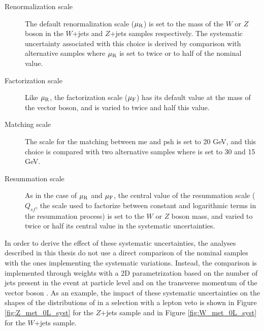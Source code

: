 \begin{description}
\item[Renormalization scale] The default renormalization scale ($\mu_{\rm{R}}$) is set to the mass of the $W$ or $Z$ boson in the $W$+jets and $Z$+jets samples respectively. 
The systematic uncertainty associated with this choice is derived by comparison with alternative samples where $\mu_{\rm{R}}$ is set to twice or to half of the nominal value. 

\item[Factorization scale] Like $\mu_{\rm{R}}$, the factorization scale ($\mu_{\rm{F}}$) has its default value at the mass of the vector boson, and is varied to twice and half this value.

\item[Matching scale] The scale for the matching between \gls{me} and \gls{psh} is set to 20 GeV, and this choice is compared with two alternative samples where is set to 30 and 15 GeV.

\item[Resummation scale] As in the case of $\mu_{\rm{R}}$ and $\mu_{\rm{F}}$, the central value of the resummation scale ($Q_{sf}$, the scale used to factorize between constant and logarithmic terms
in the resummation process) is set to the $W$ or $Z$ boson mass, and varied to twice or half its central value in the systematic uncertainties. 

\end{description}

In order to derive the effect of these systematic uncertainties, the analyses described in this thesis do not use a direct comparison of the nominal 
samples with the ones implementing the systematic variations.
Instead, the comparison is implemented through weights with a 2D parametrization based on the number of jets present in the event at particle level 
and on the transverse momentum of the vector boson \cite{Anders:2291836}.
As an example, the impact of these systematic uncertainties on the shapes of the distributions of \met in a selection with a lepton veto is shown in Figure \ref{fig:Z_met_0L_syst} for the $Z$+jets sample and in Figure \ref{fig:W_met_0L_syst} for the $W$+jets sample.  

